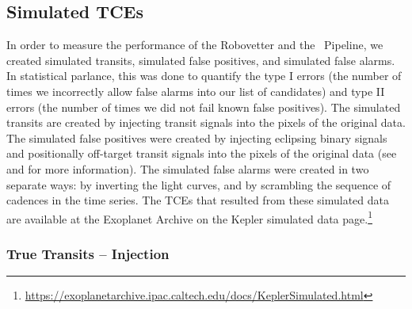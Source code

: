 \subsection{Simulated TCEs}
\label{s:simulated}
In order to measure the performance of the Robovetter and the \Kepler\ Pipeline, we created simulated transits, simulated false positives, and simulated false alarms. In statistical parlance, this was done to quantify the type I errors (the number of times we incorrectly allow false alarms into our list of candidates) and type II errors (the number of times we did not fail known false positives).  The simulated transits are created by injecting transit signals into the pixels of the original data. The simulated false positives were created by injecting eclipsing binary signals and positionally off-target transit signals into the pixels of the original data (see \citealt{Coughlin2017a} and \citealt{Christiansen2017} for more information). The simulated false alarms were created in two separate ways: by inverting the light curves, and by scrambling the sequence of cadences in the time series. The TCEs that resulted from these simulated data are available at the Exoplanet Archive on the Kepler simulated data page.\footnote{\label{kepsimpagefn}\url{https://exoplanetarchive.ipac.caltech.edu/docs/KeplerSimulated.html}}


\subsubsection{True Transits -- Injection}
\label{injectsec}

